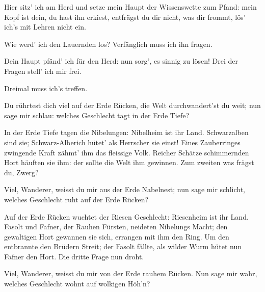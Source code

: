 \begin{drama}

Hier sitz' ich am Herd
und setze mein Haupt
der Wissenswette zum Pfand:
mein Kopf ist dein,
du hast ihn erkiest,
entfrägst du dir nicht,
was dir frommt,
lös' ich's mit Lehren nicht ein.

\Mimespeaks


Wie werd' ich den Lauernden los?
Verfänglich muss ich ihn fragen.


Dein Haupt pfänd' ich
für den Herd:
nun sorg', es sinnig zu lösen!
Drei der Fragen
stell' ich mir frei.

\Wandererspeaks

Dreimal muss ich's treffen.

\Mimespeaks


Du rührtest dich viel
auf der Erde Rücken,
die Welt durchwandert'st du weit;
nun sage mir schlau:
welches Geschlecht
tagt in der Erde Tiefe?

\Wandererspeaks

In der Erde Tiefe
tagen die Nibelungen:
Nibelheim ist ihr Land.
Schwarzalben sind sie;
Schwarz-Alberich
hütet' als Herrscher sie einst!
Eines Zauberringes
zwingende Kraft
zähmt' ihm das fleissige Volk.
Reicher Schätze
schimmernden Hort
häuften sie ihm:
der sollte die Welt ihm gewinnen.
Zum zweiten was frägst du, Zwerg?

\Mimespeaks


Viel, Wanderer,
weisst du mir
aus der Erde Nabelnest;
nun sage mir schlicht,
welches Geschlecht
ruht auf der Erde Rücken?

\Wandererspeaks

Auf der Erde Rücken
wuchtet der Riesen Geschlecht:
Riesenheim ist ihr Land.
Fasolt und Fafner,
der Rauhen Fürsten,
neideten Nibelungs Macht;
den gewaltigen Hort
gewannen sie sich,
errangen mit ihm den Ring.
Um den entbrannte
den Brüdern Streit;
der Fasolt fällte,
als wilder Wurm
hütet nun Fafner den Hort.
Die dritte Frage nun droht.

\Mimespeaks


Viel, Wanderer,
weisst du mir
von der Erde rauhem Rücken.
Nun sage mir wahr,
welches Geschlecht
wohnt auf wolkigen Höh'n?


\end{drama}
